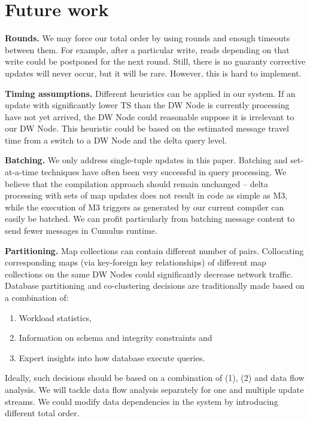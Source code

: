 \documentclass{sig-semester}
\def\M3{M3\xspace}
\begin{document}
\section{Future work}
\label{sec:Future}
\vspace{2mm}

\textbf{Rounds.} We may force our total order by using rounds and enough timeouts between them. For example, after a particular write, reads depending on that write could be postponed for the next round. Still, there is no guaranty corrective updates will never occur, but it will be rare. However, this is hard to implement.

\textbf{Timing assumptions.} Different heuristics can be applied in our system. If an update with significantly lower TS than the DW Node is currently processing have not yet arrived, the DW Node could reasonable suppose it is irrelevant to our DW Node. This heuristic could be based on the estimated message travel time from a switch to a DW Node and the delta query level.

\textbf{Batching.} We only address single-tuple updates in this paper.
Batching and set-at-a-time techniques have often been
very successful in query processing.
We believe that the compilation approach
should remain unchanged -- delta processing with sets of map updates does not
result in code as simple as \M3, while the
execution of \M3 triggers as generated by our current compiler
can easily be batched. We can profit
particularly from batching message content to send fewer messages in
Cumulus runtime.

\textbf{Partitioning.}
Map collections can contain different number of pairs. Collocating corresponding maps (via key-foreign key relationships) of different map collections on the same DW Nodes could significantly decrease network traffic. Database partitioning and co-clustering decisions are traditionally made based on a combination of: 
\begin{enumerate}[(1)]
 \item Workload statistics, 
 \item Information on schema and integrity constraints and
 \item Expert insights into how database execute queries.
\end{enumerate}

Ideally, such decisions should be based on a combination of (1), (2) and data flow analysis. We will tackle data flow analysis separately for one and multiple update streams. We could modify data dependencies in the system by introducing different total order.
\end{document}
